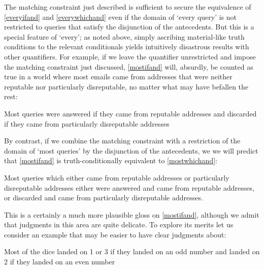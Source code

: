 \documentclass[If.tex]{subfiles}
\begin{document}
The matching constraint just described is sufficient to secure the equivalence of \ref{everyifand} and \ref{everywhichand} even if the domain of ‘every query’ is not restricted to queries that satisfy the disjunction of the antecedents.  But this is a special feature of ‘every’; as noted above, simply ascribing material-like truth conditions to the relevant conditionals yields intuitively disastrous results with other quantifiers.  For example, if we leave the quantifier unrestricted and impose the matching constraint just discussed, \ref{mostifand} will, absurdly, be counted as true in a world where most emails came from addresses that were neither reputable nor particularly disreputable, no matter what may have befallen the rest:
\begin{prop}
	\nitem \label{mostifand}
	Most queries were answered if they came from reputable addresses and discarded if they came from particularly disreputable addresses
\end{prop}
By contrast, if we combine the matching constraint with a restriction of the domain of ‘most queries’ by the disjunction of the antecedents, we we will predict that \ref{mostifand} is truth-conditionally equivalent to \ref{mostwhichand}:
\begin{prop}
	\nitem \label{mostwhichand}
	Most queries which either came from reputable addresses or particularly disreputable addresses either were answered and came from reputable addresses, or discarded and came from particularly disreputable addresses.
\end{prop}
This is a certainly a much more plausible gloss on \ref{mostifand}, although we admit that judgments in this area are quite delicate.  To explore its merits let us consider an example that may be easier to have clear judgments about:
\begin{prop}
	\nitem \label{mostdice}
	Most of the dice landed on 1 or 3 if they landed on an odd number and landed on 2 if they landed on an even number
\end{prop}
\end{document}
